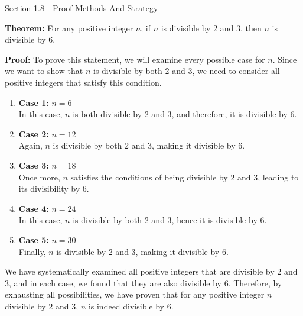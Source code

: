 \begin{notes}{Section 1.8 - Proof Methods And Strategy}
    \begin{highlight}
        \textbf{Theorem:} For any positive integer \(n\), if \(n\) is divisible by 2 and 3, then \(n\) is divisible by 6. 
    
    
        \textbf{Proof:} To prove this statement, we will examine every possible case for \(n\). Since we want to show that \(n\) is divisible by both 2 and 3, we need to consider all positive integers 
        that satisfy this condition.
    
        \begin{enumerate}
            \item \textbf{Case 1:} \(n = 6\) \\
            In this case, \(n\) is both divisible by 2 and 3, and therefore, it is divisible by 6.
    
            \item \textbf{Case 2:} \(n = 12\) \\
            Again, \(n\) is divisible by both 2 and 3, making it divisible by 6.
    
            \item \textbf{Case 3:} \(n = 18\) \\
            Once more, \(n\) satisfies the conditions of being divisible by 2 and 3, leading to its divisibility by 6.
    
            \item \textbf{Case 4:} \(n = 24\) \\
            In this case, \(n\) is divisible by both 2 and 3, hence it is divisible by 6.
    
            \item \textbf{Case 5:} \(n = 30\) \\
            Finally, \(n\) is divisible by 2 and 3, making it divisible by 6.
    
        \end{enumerate}
    
    
        We have systematically examined all positive integers that are divisible by 2 and 3, and in each case, we found that they are also divisible by 6. Therefore, by exhausting all possibilities, 
        we have proven that for any positive integer \(n\) divisible by 2 and 3, \(n\) is indeed divisible by 6.
    \end{highlight}
    

\end{notes}
